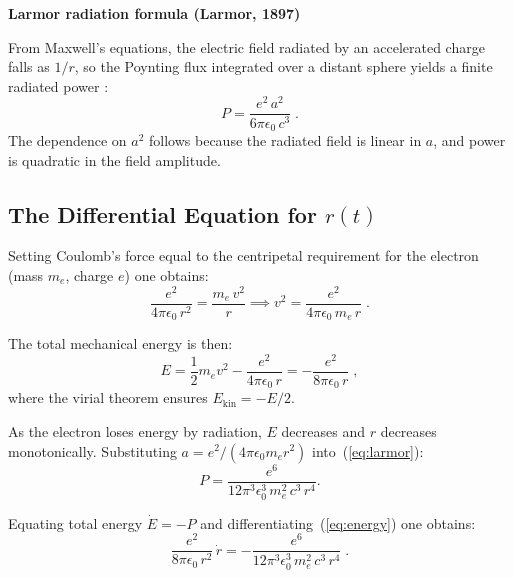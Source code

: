 \medskip

\textbf{Larmor radiation formula (Larmor, 1897)}

\medskip

From Maxwell's equations, the electric field radiated by an accelerated charge falls as $1/r$, so the Poynting flux integrated over a distant sphere yields a finite radiated power \cite{larmor_1897_radiation}:
\begin{equation}
  \boxed{P = \frac{e^2\,a^2}{6\pi\epsilon_0\,c^3}} \; .
  \label{eq:larmor}
\end{equation}
The dependence on $a^2$ follows because the radiated field is linear in $a$, and power is quadratic in the field amplitude.

\subsection{The Differential Equation for \texorpdfstring{$r(t)$}{r(t)}}
\label{subsection:ode}

Setting Coulomb's force equal to the centripetal requirement for the electron (mass $m_e$, charge $e$) one obtains:
\begin{equation}
  \frac{e^2}{4\pi\epsilon_0\,r^2} = \frac{m_e\,v^2}{r} \implies v^2 = \frac{e^2}{4\pi\epsilon_0\,m_e\,r} \; .
  \label{eq:virial-v}
\end{equation}

The total mechanical energy is then:
\begin{equation}
  E = \frac{1}{2}m_e v^2 - \frac{e^2}{4\pi\epsilon_0\,r} = -\frac{e^2}{8\pi\epsilon_0\,r} \; ,
  \label{eq:energy}
\end{equation}
where the virial theorem ensures $E_{\mathrm{kin}} = -E/2$.

\medskip

As the electron loses energy by radiation, $E$ decreases and $r$ decreases monotonically. Substituting $a = e^2/(4\pi\epsilon_0 m_e r^2)$ into~(\ref{eq:larmor}):
\begin{equation}
  P = \frac{e^6}{12\pi^3\epsilon_0^3\,m_e^2\,c^3\,r^4}.
  \label{eq:power-r}
\end{equation}

Equating total energy $\dot{E} = -P$ and differentiating~(\ref{eq:energy}) one obtains:
\begin{equation}
  \frac{e^2}{8\pi\epsilon_0\,r^2}\,\dot{r} = -\frac{e^6}{12\pi^3\epsilon_0^3\,m_e^2\,c^3\,r^4} \; .
\end{equation}

